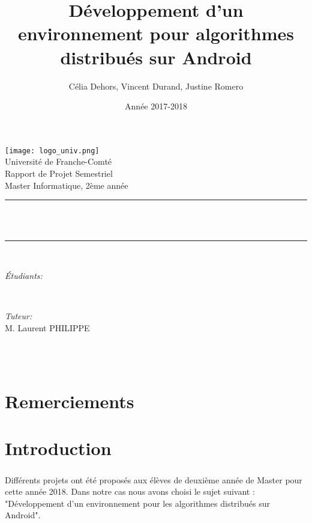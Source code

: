 \documentclass[a4paper,10pt]{report}
\title{Développement d'un environnement pour algorithmes distribués sur Android}
\author{Célia Dehors, Vincent Durand, Justine Romero}
\date{Année 2017-2018}
\makeatletter
\let\thetitle\@title
\let\theauthor\@author
\let\thedate\@date
\makeatother
\begin{document}
  
  \begin{titlepage}
    \centering
    \vspace*{0.5 cm}
    \texttt{[image: logo\_univ.png]}\\[1.0 cm]   %
    \LARGE Université de Franche-Comté\\[2.0 cm]   %
    \Large Rapport de Projet Semestriel\\               %
    \large Master Informatique, 2ème année\\[2.5 cm]               %
    \rule{\linewidth}{0.2 mm} \\[2.5 mm]
    { \huge \bfseries \thetitle}\\
    \rule{\linewidth}{0.2 mm} \\[2.0 cm]
    
    \begin{minipage}{0.6\textwidth}
        \begin{flushleft} \large
            \emph{Étudiants:}\\
            \theauthor
        \end{flushleft}
    \end{minipage}~
    \begin{minipage}{0.4\textwidth}
        \begin{flushleft} \large
            \emph{Tuteur:}\\
            M. Laurent PHILIPPE
        \end{flushleft}
    \end{minipage}\\[3.0 cm]
    {\large \thedate}\\[2 cm]
    \vfill
    
\end{titlepage}
\chapter*{Remerciements}
\begin{changemargin}{0cm}{0cm}{-10cm}{0cm}
\tableofcontents
\end{changemargin}

\chapter{Introduction}
  \paragraph{}
  Différents projets ont été proposés aux élèves de deuxième année de Master pour cette année 2018. Dans notre cas nous avons choisi le sujet suivant : "Développement d’un environnement pour les algorithmes distribués sur Android".
  
\end{document}
